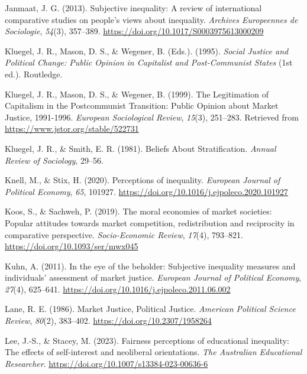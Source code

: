 \documentclass[
  12pt,
]{article}
\newlength{\cslhangindent}
\newenvironment{CSLReferences}[2] %
 {\begin{list}{}{%
  \setlength{\itemindent}{0pt}
  \setlength{\leftmargin}{0pt}
  \setlength{\parsep}{0pt}
  \ifodd #1
   \setlength{\leftmargin}{\cslhangindent}
   \setlength{\itemindent}{-1\cslhangindent}
  \fi
  \setlength{\itemsep}{#2\baselineskip}}}
 {\end{list}}
\begin{document}
\begin{CSLReferences}{1}{0}
Janmaat, J. G. (2013). Subjective inequality: {A} review of
international comparative studies on people's views about inequality.
\emph{Archives Europeennes de Sociologie}, \emph{54}(3), 357--389.
\url{https://doi.org/10.1017/S0003975613000209}

Kluegel, J. R., Mason, D. S., \& Wegener, B. (Eds.). (1995).
\emph{Social {Justice} and {Political Change}: {Public Opinion} in
{Capitalist} and {Post-Communist States}} (1st ed.). Routledge.

Kluegel, J. R., Mason, D. S., \& Wegener, B. (1999). The {Legitimation}
of {Capitalism} in the {Postcommunist Transition}: {Public Opinion}
about {Market Justice}, 1991-1996. \emph{European Sociological Review},
\emph{15}(3), 251--283. Retrieved from
\url{https://www.jstor.org/stable/522731}

Kluegel, J. R., \& Smith, E. R. (1981). Beliefs {About Stratification}.
\emph{Annual Review of Sociology}, 29--56.

Knell, M., \& Stix, H. (2020). Perceptions of inequality. \emph{European
Journal of Political Economy}, \emph{65}, 101927.
\url{https://doi.org/10.1016/j.ejpoleco.2020.101927}

Koos, S., \& Sachweh, P. (2019). The moral economies of market
societies: Popular attitudes towards market competition, redistribution
and reciprocity in comparative perspective. \emph{Socio-Economic
Review}, \emph{17}(4), 793--821.
\url{https://doi.org/10.1093/ser/mwx045}

Kuhn, A. (2011). In the eye of the beholder: {Subjective} inequality
measures and individuals' assessment of market justice. \emph{European
Journal of Political Economy}, \emph{27}(4), 625--641.
\url{https://doi.org/10.1016/j.ejpoleco.2011.06.002}

Lane, R. E. (1986). Market {Justice}, {Political Justice}.
\emph{American Political Science Review}, \emph{80}(2), 383--402.
\url{https://doi.org/10.2307/1958264}

Lee, J.-S., \& Stacey, M. (2023). Fairness perceptions of educational
inequality: The effects of self-interest and neoliberal orientations.
\emph{The Australian Educational Researcher}.
\url{https://doi.org/10.1007/s13384-023-00636-6}


\end{CSLReferences}
\end{document}
